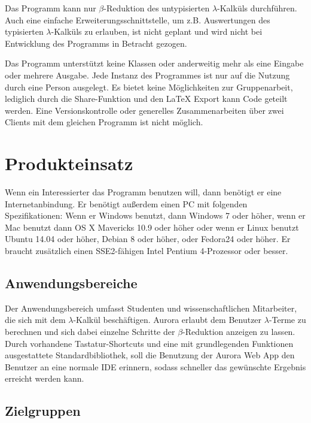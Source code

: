 \documentclass[parskip=full,11pt,twoside]{scrartcl}
\begin{document}
Das Programm kann nur $\beta$-Reduktion des untypisierten $\lambda$-Kalküls durchführen. Auch eine einfache Erweiterungsschnittstelle, um z.B. Auswertungen des typisierten $\lambda$-Kalküls zu erlauben, ist nicht geplant und wird nicht bei Entwicklung des Programms in Betracht gezogen.

Das Programm unterstützt keine Klassen oder anderweitig mehr als eine Eingabe oder mehrere Ausgabe.
Jede Instanz des Programmes ist nur auf die Nutzung durch eine Person ausgelegt. Es bietet keine Möglichkeiten zur Gruppenarbeit, lediglich durch die Share-Funktion und den LaTeX Export kann Code geteilt werden.
\newline
Eine Versionskontrolle oder generelles Zusammenarbeiten über zwei Clients mit dem gleichen Programm ist nicht möglich.



\newpage
\section{Produkteinsatz}

Wenn ein Interessierter das Programm benutzen will, dann benötigt er eine Internetanbindung. Er benötigt außerdem einen PC mit folgenden Spezifikationen: Wenn er Windows benutzt, dann Windows 7 oder höher, wenn er Mac benutzt dann OS X Mavericks 10.9 oder höher oder wenn er Linux benutzt Ubuntu 14.04 oder höher, Debian 8 oder höher, oder Fedora24 oder höher.
Er braucht zusätzlich einen SSE2-fähigen Intel Pentium 4-Prozessor oder besser.

\subsection{Anwendungsbereiche}

Der Anwendungsbereich umfasst Studenten und wissenschaftlichen Mitarbeiter, die sich mit dem $\lambda$-Kalkül beschäftigen. Aurora erlaubt dem Benutzer $\lambda$-Terme zu berechnen und sich dabei einzelne Schritte der $\beta$-Reduktion anzeigen zu lassen. Durch vorhandene Tastatur-Shortcuts und eine mit grundlegenden Funktionen ausgestattete Standardbibliothek, soll die Benutzung der Aurora Web App den Benutzer an eine normale IDE erinnern, sodass schneller das gewünschte Ergebnis erreicht werden kann.

\subsection{Zielgruppen}
\end{document}
